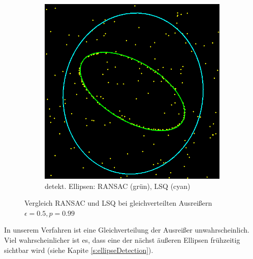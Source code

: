\begin{figure}[!htb]
\begin{subfigure}{.5\textwidth}
		\includegraphics[width=.9\textwidth]{images/ransac50_1.png}
		\caption{detekt. Ellipsen: RANSAC (grün), LSQ (cyan)}
	\end{subfigure}
	\label{fig:bla}
	\caption{Vergleich RANSAC und LSQ bei gleichverteilten Ausreißern $\epsilon = 0.5, p = 0.99$}
\end{figure}

In unserem Verfahren ist eine Gleichverteilung der Ausreißer unwahrscheinlich. Viel wahrscheinlicher ist es, dass eine der nächst äußeren Ellipsen frühzeitig sichtbar wird (siehe Kapite \ref{s:ellipseDetection}). 

